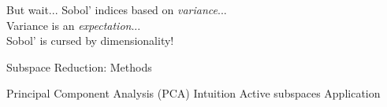 \documentclass[14pt]{beamer}
\begin{document}
\begin{frame}{But wait...}
  Sobol' indices based on \emph{variance}... \\
  Variance is an \emph{expectation}... \\

  \bigskip Sobol' is cursed by dimensionality!
\end{frame}

\begin{frame}{Subspace Reduction: Methods}
  \begin{outline}
    \1 Principal Component Analysis (PCA)
      \2 Intuition
    \1 Active subspaces
      \2 Application
  \end{outline}
\end{frame}
\end{document}
